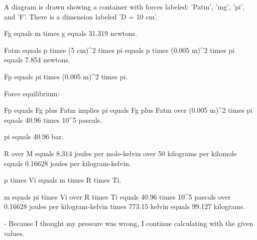 A diagram is drawn showing a container with forces labeled: 'Patm', 'mg', 'pi', and 'F'. There is a dimension labeled 'D = 10 cm'.

Fg equals m times g equals 31.319 newtons.

Fatm equals p times (5 cm)^2 times pi equals p times (0.005 m)^2 times pi equals 7.854 newtons.

Fp equals pi times (0.005 m)^2 times pi.

Force equilibrium:

Fp equals Fg plus Fatm implies pi equals Fg plus Fatm over (0.005 m)^2 times pi equals 40.96 times 10^5 pascals.

pi equals 40.96 bar.

R over M equals 8.314 joules per mole-kelvin over 50 kilograms per kilomole equals 0.16628 joules per kilogram-kelvin.

p times Vi equals m times R times Ti.

m equals pi times Vi over R times Ti equals 40.96 times 10^5 pascals over 0.16628 joules per kilogram-kelvin times 773.15 kelvin equals 99.127 kilograms.

- Because I thought my pressure was wrong, I continue calculating with the given values.